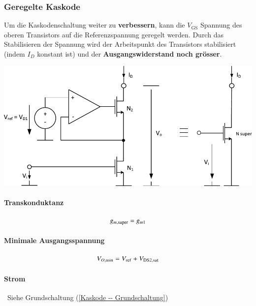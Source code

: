 \subsubsection{Geregelte Kaskode}
Um die Kaskodenschaltung weiter zu \textbf{verbessern}, kann die $V_\text{GS}$ Spannung des oberen Transistors auf die Referenzspannung geregelt werden.
Durch das Stabilisieren der Spannung wird der Arbeitspunkt des Transistors stabilisiert (indem $I_D$ konstant ist) und der \textbf{Ausgangswiderstand noch grösser}.

\smallskip

\begin{minipage}[t]{0.55\columnwidth}
    \includegraphics[width=\columnwidth, align=t]{images/05_stromquelle_geregelte_kaskode_opamp.pdf}
\end{minipage}
\hfill
\begin{minipage}[t]{0.42\columnwidth}

    \paragraph{Transkonduktanz}

    \vspace{-0.3cm}
    \[
        g_{m,\rm super} = g_{m1}
    \]            

    \paragraph{Minimale Ausgangsspannung}

    \vspace{-0.2cm}
    \[
        V_{O, \rm min} =  V_{\rm ref} + V_{\rm DS2, sat}
    \]

    \paragraph{Strom}

    \textrightarrow\ Siehe Grundschaltung (\ref{Kaskode -- Grundschaltung})
\end{minipage}


